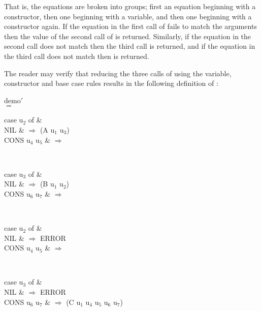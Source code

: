 That is, the equations are broken into groups; first an equation beginning with a constructor, then one beginning with a variable, and then one beginning with a constructor again. If the equation in the first call of  fails to match the arguments then the value of the second call of  is returned. Similarly, if the equation in the second call does not match then the third call is returned, and if the equation in the third call does not match then  is returned.

The reader may verify that reducing the three calls of  using the variable, constructor and base case rules results in the following definition of :
\begin{mlcoded}
        \setlength{\tabcolsep}{0.25em}
demo$'$\\
$=$  \\
\hspace{3em}
\begin{minipage}{1.5in}
    \begin{letalign}
case u$_2$ of & \\
NIL & $\Rightarrow$ (A u$_1$ u$_3$)\\
CONS u$_4$ u$_5$ & $\Rightarrow$ \\
\end{letalign}
\end{minipage}\\
\begin{minipage}{1.5in}
    \begin{letalign}
        case u$_3$ of & \\
        NIL & $\Rightarrow$ (B u$_1$ u$_2$)\\
        CONS u$_6$ u$_7$ & $\Rightarrow$ \\
    \end{letalign}
\end{minipage}\\
\begin{minipage}{1.5in}
    \begin{letalign}
        case u$_2$ of & \\
        NIL & $\Rightarrow$ ERROR\\
        CONS u$_4$ u$_5$ & $\Rightarrow$ \\
    \end{letalign}
\end{minipage}\\
\begin{minipage}{1.5in}
    \begin{letalign}
        case u$_3$ of & \\
        NIL & $\Rightarrow$ ERROR\\
        CONS u$_6$ u$_7$ & $\Rightarrow$ (C u$_1$ u$_4$ u$_5$ u$_6$ u$_7$)\\
    \end{letalign}
\end{minipage}
\end{mlcoded}
